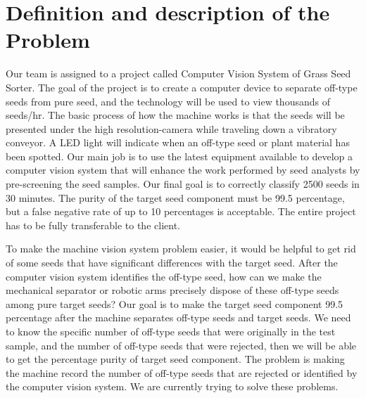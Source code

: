 \documentclass[letter,draftclsnoffot, onecolumn]{IEEEtran}
\begin{document}
\section{Definition and description of the Problem}
Our team is assigned to a project called Computer Vision System of Grass Seed Sorter. The goal of the project is to create a computer device to separate off-type seeds from pure seed, and the technology will be used to view thousands of seeds/hr.  The basic process of how the machine works is that the seeds will be presented under the high resolution-camera while traveling down a vibratory conveyor. A LED light will indicate when an off-type seed or plant material has been spotted. Our main job is to use the latest equipment available to develop a computer vision system that will enhance the work performed by seed analysts by pre-screening the seed samples. Our final goal is to correctly classify 2500 seeds in 30 minutes. The purity of the target seed component must be 99.5 percentage, but a false negative rate of up to 10 percentages is acceptable. The entire project has to be fully transferable to the client. 
\par
To make the machine vision system problem easier, it would be helpful to get rid of some seeds that have significant differences with the target seed. After the computer vision system identifies the off-type seed, how can we make the mechanical separator or robotic arms precisely dispose of these off-type seeds among pure target seeds? Our goal is to make the target seed component 99.5 percentage after the machine separates off-type seeds and target seeds. We need to know the specific number of off-type seeds that were originally in the test sample, and the number of off-type seeds that were rejected, then we will be able to get the percentage purity of target seed component. The problem is making the machine record the number of off-type seeds that are rejected or identified by the computer vision system. We are currently trying to solve these problems. 
\pagebreak
\end{document}
